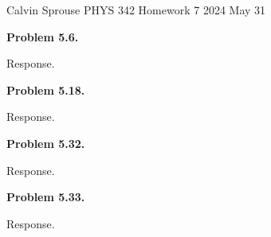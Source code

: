 \documentclass[a4paper, 12pt]{config/homework}
\begin{document}
\noindent
Calvin Sprouse \hfill PHYS 342 Homework 7 \hfill 2024 May 31
\bigskip

\bigskip\noindent
\textbf{Problem 5.6.}

\bigskip\noindent
Response.

\pagebreak\noindent
\textbf{Problem 5.18.}

\bigskip\noindent
Response.

\pagebreak\noindent
\textbf{Problem 5.32.}

\bigskip\noindent
Response.

\pagebreak\noindent
\textbf{Problem 5.33.}

\bigskip\noindent
Response.
\end{document}
